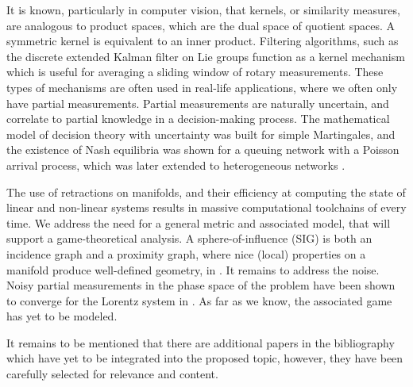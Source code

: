 It is known, particularly in computer vision, that kernels,
or similarity measures, are analogous to product spaces, which are the
dual space of quotient spaces. A symmetric kernel is equivalent to an inner
product. Filtering algorithms, such as the discrete 
extended Kalman filter on Lie
groups \citet{RMANI} function as a kernel
mechanism which is useful for averaging a sliding window of rotary
measurements. These types of mechanisms are often used in real-life
applications, where we often only have partial measurements. Partial
measurements are naturally uncertain, and correlate to partial knowledge in a
decision-making process. The mathematical model of decision theory with uncertainty 
was built for
simple Martingales, and the existence of Nash equilibria was shown for a
queuing network with a Poisson arrival process, which was
later extended to heterogeneous networks \citet{SUPS}.

The use of retractions on manifolds, and their efficiency at computing the
state of linear and non-linear systems results in massive computational
toolchains of every time. We address the need for a general metric and
associated model, that will support a game-theoretical analysis. A
sphere-of-influence (SIG) is both an incidence graph and a proximity graph,
where nice (local) properties on a manifold produce well-defined geometry, in
\citet{SIG}.
It remains to address the noise. Noisy partial measurements in the phase space
of the problem have been shown to converge for the Lorentz system in \citet{AVG}. 
As far as we know, the associated game has yet to be
modeled.

It remains to be mentioned that there are additional papers in the bibliography
which have yet to be integrated into the proposed topic, however, they have been
carefully selected for relevance and content.
